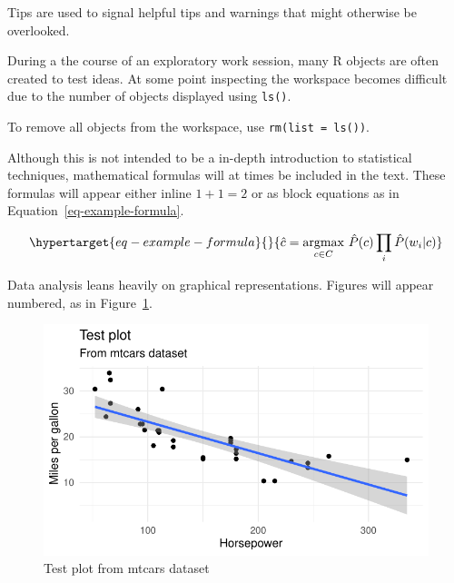 \documentclass[
  letterpaper,
]{scrbook}
\begin{document}
Tips are used to signal helpful tips and warnings that might otherwise
be overlooked.

\begin{tcolorbox}[enhanced jigsaw, title=\textcolor{quarto-callout-warning-color}{\faExclamationTriangle}\hspace{0.5em}{Tip}, breakable, colback=white, colframe=quarto-callout-warning-color-frame, bottomrule=.15mm, left=2mm, bottomtitle=1mm, colbacktitle=quarto-callout-warning-color!10!white, opacityback=0, arc=.35mm, toprule=.15mm, coltitle=black, leftrule=.75mm, opacitybacktitle=0.6, toptitle=1mm, titlerule=0mm, rightrule=.15mm]

During a the course of an exploratory work session, many R objects are
often created to test ideas. At some point inspecting the workspace
becomes difficult due to the number of objects displayed using
\texttt{ls()}.

To remove all objects from the workspace, use
\texttt{rm(list\ =\ ls())}.

\end{tcolorbox}

Although this is not intended to be a in-depth introduction to
statistical techniques, mathematical formulas will at times be included
in the text. These formulas will appear either inline \(1 + 1 = 2\) or
as block equations as in Equation~\ref{eq-example-formula}.

\begin{equation}\protect\hypertarget{eq-example-formula}{}{
\hat{c} = \underset{c \in C} {\mathrm{argmax}} ~\hat{P}(c) \prod_i \hat{P}(w_i|c)
}\label{eq-example-formula}\end{equation}

Data analysis leans heavily on graphical representations. Figures will
appear numbered, as in Figure~\ref{fig-test-fig}.

\begin{figure}[h]

{\centering \includegraphics{./preface_files/figure-pdf/fig-test-fig-1.pdf}

}

\caption{\label{fig-test-fig}Test plot from mtcars dataset}

\end{figure}
\end{document}
